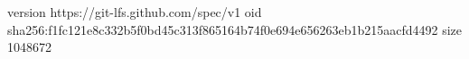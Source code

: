 version https://git-lfs.github.com/spec/v1
oid sha256:f1fc121e8c332b5f0bd45c313f865164b74f0e694e656263eb1b215aacfd4492
size 1048672
